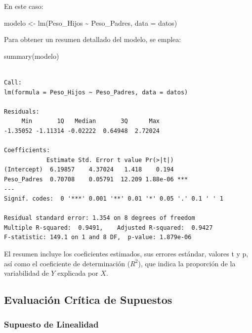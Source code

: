 \documentclass[
  spanish,
  letterpaper,
]{book}
\newenvironment{Shaded}{\begin{snugshade}}{\end{snugshade}}
\newcommand{\AttributeTok}[1]{\textcolor[rgb]{0.40,0.45,0.13}{#1}}
\newcommand{\FunctionTok}[1]{\textcolor[rgb]{0.28,0.35,0.67}{#1}}
\newcommand{\NormalTok}[1]{\textcolor[rgb]{0.00,0.23,0.31}{#1}}
\newcommand{\OtherTok}[1]{\textcolor[rgb]{0.00,0.23,0.31}{#1}}
\newcommand{\SpecialCharTok}[1]{\textcolor[rgb]{0.37,0.37,0.37}{#1}}
\begin{document}
En este caso:

\begin{Shaded}
\begin{Highlighting}[]
\NormalTok{modelo }\OtherTok{\textless{}{-}} \FunctionTok{lm}\NormalTok{(Peso\_Hijos }\SpecialCharTok{\textasciitilde{}}\NormalTok{ Peso\_Padres, }\AttributeTok{data =}\NormalTok{ datos)}
\end{Highlighting}
\end{Shaded}

Para obtener un resumen detallado del modelo, se emplea:

\begin{Shaded}
\begin{Highlighting}[]
\FunctionTok{summary}\NormalTok{(modelo)}
\end{Highlighting}
\end{Shaded}

\begin{verbatim}

Call:
lm(formula = Peso_Hijos ~ Peso_Padres, data = datos)

Residuals:
     Min       1Q   Median       3Q      Max 
-1.35052 -1.11314 -0.02222  0.64948  2.72024 

Coefficients:
            Estimate Std. Error t value Pr(>|t|)    
(Intercept)  6.19857    4.37024   1.418    0.194    
Peso_Padres  0.70708    0.05791  12.209 1.88e-06 ***
---
Signif. codes:  0 '***' 0.001 '**' 0.01 '*' 0.05 '.' 0.1 ' ' 1

Residual standard error: 1.354 on 8 degrees of freedom
Multiple R-squared:  0.9491,    Adjusted R-squared:  0.9427 
F-statistic: 149.1 on 1 and 8 DF,  p-value: 1.879e-06
\end{verbatim}

El resumen incluye los coeficientes estimados, sus errores estándar,
valores t y p, así como el coeficiente de determinación (\(R^2\)), que
indica la proporción de la variabilidad de \(Y\) explicada por \(X\).

\subsection{Evaluación Crítica de
Supuestos}\label{evaluaciuxf3n-cruxedtica-de-supuestos}

\subsubsection{Supuesto de Linealidad}\label{supuesto-de-linealidad}
\end{document}
